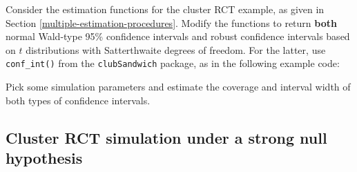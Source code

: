 \documentclass[
]{book}
\newenvironment{Shaded}{\begin{snugshade}}{\end{snugshade}}
\newcommand{\AttributeTok}[1]{\textcolor[rgb]{0.13,0.29,0.53}{#1}}
\newcommand{\DecValTok}[1]{\textcolor[rgb]{0.00,0.00,0.81}{#1}}
\newcommand{\FunctionTok}[1]{\textcolor[rgb]{0.13,0.29,0.53}{\textbf{#1}}}
\newcommand{\NormalTok}[1]{#1}
\newcommand{\OtherTok}[1]{\textcolor[rgb]{0.56,0.35,0.01}{#1}}
\newcommand{\SpecialCharTok}[1]{\textcolor[rgb]{0.81,0.36,0.00}{\textbf{#1}}}
\newcommand{\StringTok}[1]{\textcolor[rgb]{0.31,0.60,0.02}{#1}}
\begin{document}
Consider the estimation functions for the cluster RCT example, as given in Section \ref{multiple-estimation-procedures}.
Modify the functions to return \textbf{both} normal Wald-type 95\% confidence intervals and robust confidence intervals based on \(t\) distributions with Satterthwaite degrees of freedom.
For the latter, use \texttt{conf\_int()} from the \texttt{clubSandwich} package, as in the following example code:

\begin{Shaded}
\end{Shaded}

Pick some simulation parameters and estimate the coverage and interval width of both types of confidence intervals.

\subsection{Cluster RCT simulation under a strong null hypothesis}\label{cluster-rct-simulation-under-a-strong-null-hypothesis}
\end{document}
